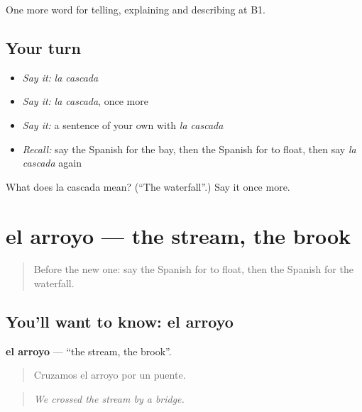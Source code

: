 \begin{grammarlens}[title={What you've built}]
One more word for telling, explaining and describing at B1.
\end{grammarlens}

\subsection*{Your turn}
\begin{itemize}
\raggedright
  \item \emph{Say it:} \emph{la cascada}
  \item \emph{Say it:} \emph{la cascada}, once more
  \item \emph{Say it:} a sentence of your own with \emph{la cascada}
  \item \emph{Recall:} say the Spanish for the bay, then the Spanish for to float, then say \emph{la cascada} again
\end{itemize}

\begin{tcolorbox}[breakable,colback=teal!4,colframe=teal!35!black,title={Before you move on}]
What does la cascada mean? (\textquotedblleft{}The waterfall\textquotedblright{}.) Say it once more.
\end{tcolorbox}
\section[el arroyo]{el arroyo — the stream, the brook}

\label{lesson:ES-C689-arroyo}



\begin{quote}
Before the new one: say the Spanish for to float, then the Spanish for the waterfall.
\end{quote}

\subsection*{You'll want to know: el arroyo}
\textbf{el arroyo} — \textquotedblleft{}the stream, the brook\textquotedblright{}.

\begin{quote}
Cruzamos el arroyo por un puente.
\end{quote}

\begin{quote}
\emph{We crossed the stream by a bridge.}
\end{quote}

